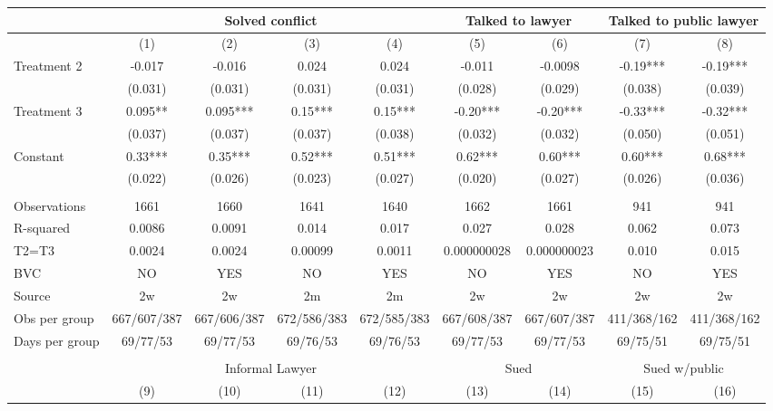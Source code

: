 \begin{tabular}{lcccccccc}
\toprule
      & \multicolumn{4}{c}{Solved conflict} & \multicolumn{2}{c}{Talked to lawyer} & \multicolumn{2}{c}{Talked to public lawyer} \\
\midrule
\midrule
      & (1)   & (2)   & (3)   & (4)   & (5)   & (6)   & (7)   & (8) \\
\midrule
\midrule
Treatment 2 & -0.017 & -0.016 & 0.024 & 0.024 & -0.011 & -0.0098 & -0.19*** & -0.19*** \\
      & (0.031) & (0.031) & (0.031) & (0.031) & (0.028) & (0.029) & (0.038) & (0.039) \\
Treatment 3 & 0.095** & 0.095*** & 0.15*** & 0.15*** & -0.20*** & -0.20*** & -0.33*** & -0.32*** \\
      & (0.037) & (0.037) & (0.037) & (0.038) & (0.032) & (0.032) & (0.050) & (0.051) \\
Constant  & 0.33*** & 0.35*** & 0.52*** & 0.51*** & 0.62*** & 0.60*** & 0.60*** & 0.68*** \\
      & (0.022) & (0.026) & (0.023) & (0.027) & (0.020) & (0.027) & (0.026) & (0.036) \\
      &       &       &       &       &       &       &       &  \\
\midrule
Observations & 1661  & 1660  & 1641  & 1640  & 1662  & 1661  & 941   & 941 \\
R-squared & 0.0086 & 0.0091 & 0.014 & 0.017 & 0.027 & 0.028 & 0.062 & 0.073 \\
T2=T3 & 0.0024 & 0.0024 & 0.00099 & 0.0011 & 0.000000028 & 0.000000023 & 0.010 & 0.015 \\
BVC   & NO    & YES   & NO    & YES   & NO    & YES   & NO    & YES \\
Source & 2w    & 2w    & 2m    & 2m    & 2w    & 2w    & 2w    & 2w \\
Obs per group & 667/607/387 & 667/606/387 & 672/586/383 & 672/585/383 & 667/608/387 & 667/607/387 & 411/368/162 & 411/368/162 \\
Days per group & 69/77/53 & 69/77/53 & 69/76/53 & 69/76/53 & 69/77/53 & 69/77/53 & 69/75/51 & 69/75/51 \\
\midrule
\midrule
      &       &       &       &       &       &       &       &  \\
\midrule
      & \multicolumn{4}{c}{Informal Lawyer} & \multicolumn{2}{c}{Sued} & \multicolumn{2}{c}{Sued w/public} \\
\midrule
\midrule
      & (9)   & (10)  & (11)  & (12)  & (13)  & (14)  & (15)  & (16) \\

\end{tabular}
